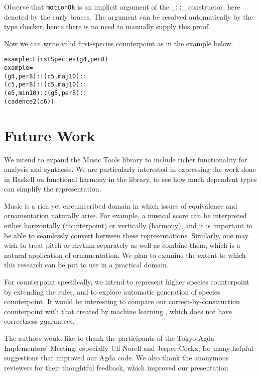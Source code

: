 \documentclass[sigplan,10pt,screen]{acmart}
\begin{document}
\noindent Observe that \texttt{motionOk} is an implicit argument of 
the \texttt{\_::\_} constructor, here denoted by the curly braces. 
The argument can be resolved automatically by the type checker,
hence there is no need to manually supply this proof. 

Now we can write valid first-species counterpoint as in the 
example below.

\begin{alltt}
example : FirstSpecies (g 4 , per8)
example = 
  (g 4 , per8) :: (c 5 , maj10) ::
  (c 5 , per8) :: (c 5 , maj10) ::
  (e 5 , min10) :: (g 5 , per8) ::
  (cadence2 (c 6))
\end{alltt}


\section{Future Work}

We intend to expand the Music Tools library to include
richer functionality for analysis and synthesis. We are
particularly interested in expressing the work done in Haskell
on functional harmony in the library, to see how much
dependent types can simplify the representation.

Music is a rich yet circumscribed domain in which
issues of equivalence \citep{tabareau2017equivalences}
and ornamentation \citep{dagand2017essence} naturally arise.
For example, a
musical score can be interpreted either horizontally (counterpoint) or
vertically (harmony), and it is important to be able to seamlessly
convert between these representations. Similarly, one may wish to treat
pitch or rhythm separately as well as combine them, which is a natural
application of ornamentation. We plan to examine the extent to which this
research can be put to use in a practical domain.

For counterpoint specifically, we intend to represent higher species 
counterpoint by extending the rules, 
and to explore automatic generation of species counterpoint.
It would be interesting to compare our correct-by-construction counterpoint
with that created by machine learning \citep{CounterpointByConvolution}, 
which does not have correctness guarantees.

\begin{acks}                            %
 The authors would like to thank the participants of the Tokyo Agda 
 Implementors' Meeting, especially Ulf Norell and Jesper Cockx,
 for many helpful suggestions that improved our Agda code.
 We also thank the anonymous reviewers for their thoughtful feedback,
 which improved our presentation.
\end{acks}



\end{document}
